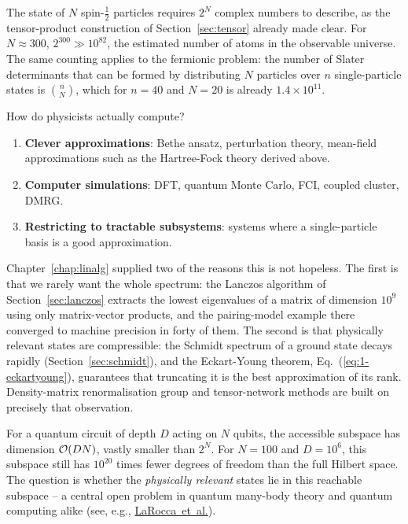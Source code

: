 The state of $N$ spin-$\frac12$ particles requires $2^N$ complex numbers to
describe, as the tensor-product construction of Section~\ref{sec:tensor}
already made clear.  For $N\approx 300$, $2^{300}\gg 10^{82}$, the estimated
number of atoms in the observable universe.  The same counting applies to the
fermionic problem: the number of Slater determinants that can be formed by
distributing $N$ particles over $n$ single-particle states is $\binom{n}{N}$,
which for $n=40$ and $N=20$ is already $1.4\times10^{11}$.

How do physicists actually compute?
\begin{enumerate}
  \item \textbf{Clever approximations}: Bethe ansatz, perturbation
        theory, mean-field approximations such as the Hartree-Fock theory
        derived above.
  \item \textbf{Computer simulations}: DFT, quantum Monte Carlo, FCI,
        coupled cluster, DMRG.
  \item \textbf{Restricting to tractable subsystems}: systems where a
        single-particle basis is a good approximation.
\end{enumerate}

Chapter~\ref{chap:linalg} supplied two of the reasons this is not hopeless.
The first is that we rarely want the whole spectrum: the Lanczos algorithm of
Section~\ref{sec:lanczos} extracts the lowest eigenvalues of a matrix of
dimension $10^9$ using only matrix-vector products, and the pairing-model
example there converged to machine precision in forty of them.  The second is
that physically relevant states are compressible: the Schmidt spectrum of a
ground state decays rapidly (Section~\ref{sec:schmidt}), and the
Eckart-Young theorem, Eq.~(\ref{eq:1-eckartyoung}), guarantees that
truncating it is the best approximation of its rank.  Density-matrix
renormalisation group and tensor-network methods are built on precisely that
observation.

For a quantum circuit of depth $D$ acting on $N$ qubits, the accessible
subspace has dimension $\mathcal{O}(DN)$, vastly smaller than $2^N$.  For $N=100$
and $D=10^6$, this subspace still has $10^{20}$ times fewer degrees of freedom
than the full Hilbert space.  The question is whether the \emph{physically
relevant} states lie in this reachable subspace -- a central open problem in
quantum many-body theory and quantum computing alike (see, e.g.,
\href{https://www.nature.com/articles/s42254-025-00813-9}{LaRocca~et~al.}).

